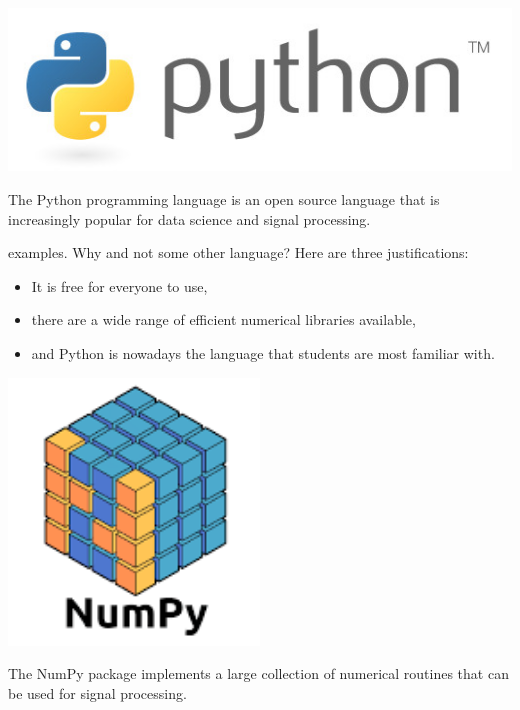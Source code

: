 \begin{marginfigure}
\includegraphics[width=\textwidth]{ch02/figures/pylogo.jpg}
\caption{The Python programming language is an open source language that is increasingly popular for data science and signal processing.}
\end{marginfigure}

 examples. Why  and not some other
language? Here are three justifications:
\begin{itemize}
\item It is free for everyone to use,
\item there are a wide range of efficient numerical libraries available,
\item and Python is nowadays the language that students are most familiar with.
\end{itemize}

\begin{marginfigure}
\begin{center}
\includegraphics[width=0.5\textwidth]{ch02/figures/numpylogo.png}
\end{center}
\caption{The NumPy package implements a large collection of numerical routines that can be used for signal processing.}
\end{marginfigure}

